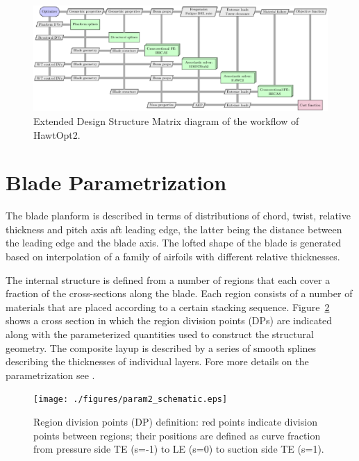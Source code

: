 \begin{figure}[!ht]
\begin{center}
	\includegraphics[width=1\linewidth]{figures/hawtopt2_xdsm.eps}
\end{center}
\caption{Extended Design Structure Matrix diagram of the workflow of HawtOpt2.}
\label{fig:xdsm}
\end{figure}


\section{Blade Parametrization}
\label{sec:blade_params}

The blade planform is described in terms of distributions of chord, twist, relative thickness and pitch axis aft leading edge, the latter being the distance between the leading edge and the blade axis.
The lofted shape of the blade is generated based on interpolation of a family of airfoils with different relative thicknesses.

The internal structure is defined from a number of regions that each cover a fraction of the cross-sections along the blade.
Each region consists of a number of materials that are placed according to a certain stacking sequence.
Figure~\ref{fig:cross_section_def} shows a cross section in which the region division points (DPs) are indicated along with the parameterized quantities used to construct the structural geometry.
The composite layup is described by a series of smooth splines describing the thicknesses of individual layers. 
Fore more details on the parametrization see \cite{fusedwind}.

\begin{figure}[!ht]
\begin{center}
        \texttt{[image: ./figures/param2\_schematic.eps]}
\end{center}
\caption{Region division points (DP) definition: red points indicate division points between regions; their positions are defined as curve fraction from pressure side TE (s=-1) to LE (s=0) to suction side TE (s=1).}
\label{fig:cross_section_def}
\end{figure}

